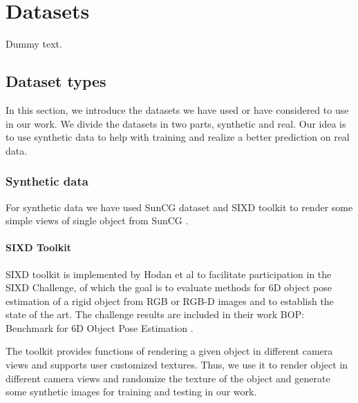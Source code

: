 \chapter{Datasets}

Dummy text.

\section{Dataset types}

In this section, we introduce the datasets we have used or have considered to use in our work. We divide the datasets in two parts, synthetic and real. Our idea is to use synthetic data to help with training and realize a better prediction on real data.

\subsection{Synthetic data}

For synthetic data we have used SunCG dataset and SIXD toolkit to render some simple views of single object from SunCG .


\subsubsection{SIXD Toolkit}

SIXD toolkit is implemented by Hodan et al to facilitate participation in the SIXD Challenge, of which the goal is to evaluate methods for 6D object pose estimation of a rigid object from RGB or RGB-D images and to establish the state of the art. The challenge results are included in their work BOP: Benchmark for 6D Object Pose Estimation \cite{hodan2018bop}.

The toolkit provides functions of rendering a given object in different camera views and supports user customized textures. Thus, we use it to render object in different camera views and randomize the texture of the object and generate some synthetic images for training and testing in our work.




